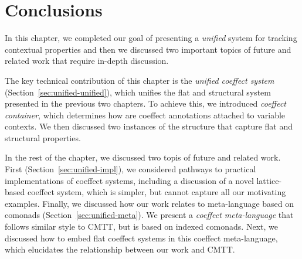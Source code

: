 \section{Conclusions}

In this chapter, we completed our goal of presenting a \emph{unified} system for tracking contextual
properties and then we discussed two important topics of future and related work that require 
in-depth discussion.

The key technical contribution of this chapter is the \emph{unified coeffect system} 
(Section~\ref{sec:unified-unified}), which unifies the flat and structural system presented
in the previous two chapters. To achieve this, we introduced \emph{coeffect container}, which
determines how are coeffect annotations attached to variable contexts. We then discussed two
instances of the structure that capture flat and structural properties.

In the rest of the chapter, we discussed two topis of future and related work. First
(Section~\ref{sec:unified-impl}), we considered pathways to practical implementations of
coeffect systems, including a discussion of a novel lattice-based coeffect system, which is simpler,
but cannot capture all our motivating examples. Finally, we discussed how our work relates to 
meta-language based on comonads (Section~\ref{sec:unified-meta}). We present a \emph{coeffect 
meta-language} that follows similar style to CMTT, but is based on indexed comonads. Next, we 
discussed how to embed flat coeffect systems in this coeffect meta-language, which elucidates the 
relationship between our work and CMTT. 
